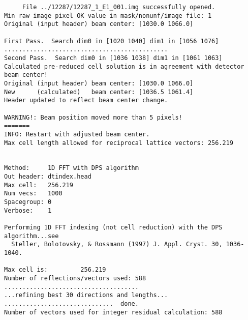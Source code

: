 \documentclass[a4paper, 11pt]{article}
\begin{document}
{\begin{verbatim}
     File ../12287/12287_1_E1_001.img successfully opened.
Min raw image pixel OK value in mask/nonunf/image file: 1
Original (input header) beam center: [1030.0 1066.0]

First Pass.  Search dim0 in [1020 1040] dim1 in [1056 1076]
.............................................
Second Pass.  Search dim0 in [1036 1038] dim1 in [1061 1063]
Calculated pre-reduced cell solution is in agreement with detector beam center!
Original (input header) beam center: [1030.0 1066.0]
New      (calculated)   beam center: [1036.5 1061.4]
Header updated to reflect beam center change.

WARNING!: Beam position moved more than 5 pixels!
=======
INFO: Restart with adjusted beam center.
Max cell length allowed for reciprocal lattice vectors: 256.219


Method:     1D FFT with DPS algorithm
Out header: dtindex.head
Max cell:   256.219
Num vecs:   1000
Spacegroup: 0
Verbose:    1

Performing 1D FFT indexing (not cell reduction) with the DPS algorithm...see
  Steller, Bolotovsky, & Rossmann (1997) J. Appl. Cryst. 30, 1036-1040.

Max cell is:         256.219
Number of reflections/vectors used: 588
.....................................
...refining best 30 directions and lengths...
..............................  done.
Number of vectors used for integer residual calculation: 588


\end{verbatim}}
\end{document}
